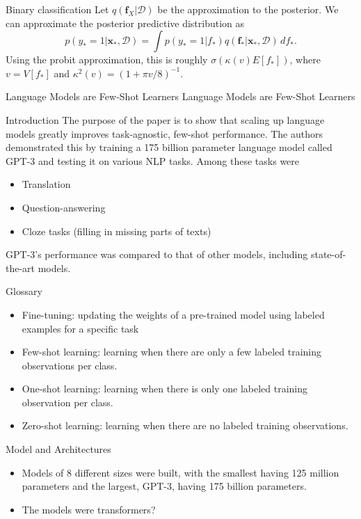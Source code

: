 \documentclass{beamer}
\begin{document}
\begin{frame}{Binary classification}
    Let $q(\boldsymbol{f}_X | \mathcal{D})$ be the approximation to the posterior. We can approximate the posterior predictive distribution as
    \[
    p(y_* = 1 | \boldsymbol{x}_*, \mathcal{D}) = \int p(y_* = 1 | f_*)q(\boldsymbol{f}_* | \boldsymbol{x}_*, \mathcal{D})\,df_*.
    \]
    Using the probit approximation, this is roughly $\sigma(\kappa(v)E[f_*])$, where $v = V[f_*]$ and $\kappa^2(v) = (1 + \pi v / 8)^{-1}$.
\end{frame}

\begin{frame}{Language Models are Few-Shot Learners}
    Language Models are Few-Shot Learners
\end{frame}

\begin{frame}{Introduction}
    The purpose of the paper is to show that scaling up language models greatly improves task-agnostic, few-shot performance. The authors demonstrated this by training a 175 billion parameter language model called GPT-3 and testing it on various NLP tasks. Among these tasks were
    \begin{itemize}
        \item Translation
        \item Question-answering
        \item Cloze tasks (filling in missing parts of texts)
    \end{itemize}
    GPT-3's performance was compared to that of other models, including state-of-the-art models.
\end{frame}

\begin{frame}{Glossary}
    \begin{itemize}
        \item Fine-tuning: updating the weights of a pre-trained model using labeled examples for a specific task
        \item Few-shot learning: learning when there are only a few labeled training observations per class.
        \item One-shot learning: learning when there is only one labeled training observation per class.
        \item Zero-shot learning: learning when there are no labeled training observations.
    \end{itemize}
\end{frame}

\begin{frame}{Model and Architectures}
    \begin{itemize}
        \item Models of 8 different sizes were built, with the smallest having 125 million parameters and the largest, GPT-3, having 175 billion parameters.
        \item The models were transformers?
    \end{itemize}
\end{frame}
\end{document}
